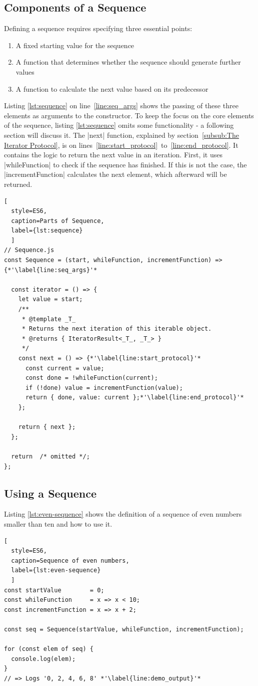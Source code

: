 \subsection{Components of a Sequence}
\label{sub:Components of a Sequence}
Defining a sequence requires specifying three essential points:
\begin{enumerate}
  \item{A fixed starting value for the sequence} 
  \item{A function that determines whether the sequence should generate
    further values} 
  \item{A function to calculate the next value based on its predecessor} 
\end{enumerate}
Listing \ref{lst:sequence} on line~\ref{line:seq_args} shows the passing of
these three elements as arguments to the constructor. To keep the focus on the
core elements of the sequence,  listing \ref{lst:sequence} omits some
functionality - a following section will discuss it. The |next| function, explained by
section~\ref{subsub:The Iterator Protocol}, is on
lines~\ref{line:start_protocol}~to~\ref{line:end_protocol}. It contains the
logic to return the next value in an iteration. First, it uses |whileFunction|
to check if the sequence has finished. If this is not the case, the
|incrementFunction| calculates the next element, which afterward will be
returned.

\begin{lstlisting}[
  style=ES6, 
  caption=Parts of Sequence,
  label={lst:sequence}
  ]
// Sequence.js
const Sequence = (start, whileFunction, incrementFunction) => {*'\label{line:seq_args}'*

  const iterator = () => {
    let value = start;
    /**
     * @template _T_
     * Returns the next iteration of this iterable object.
     * @returns { IteratorResult<_T_, _T_> }
     */
    const next = () => {*'\label{line:start_protocol}'*
      const current = value;
      const done = !whileFunction(current);
      if (!done) value = incrementFunction(value);
      return { done, value: current };*'\label{line:end_protocol}'*
    };

    return { next };
  };

  return  /* omitted */;
};
\end{lstlisting}

\subsection{Using a Sequence}
\label{sub:Using a Sequence}
Listing \ref{lst:even-sequence} shows the definition of a sequence of even 
numbers smaller than ten and how to use it. 
\begin{lstlisting}[
  style=ES6, 
  caption=Sequence of even numbers,
  label={lst:even-sequence}
  ]
const startValue        = 0;
const whileFunction     = x => x < 10;
const incrementFunction = x => x + 2;

const seq = Sequence(startValue, whileFunction, incrementFunction);

for (const elem of seq) {
  console.log(elem);
}
// => Logs '0, 2, 4, 6, 8' *'\label{line:demo_output}'*
\end{lstlisting}

